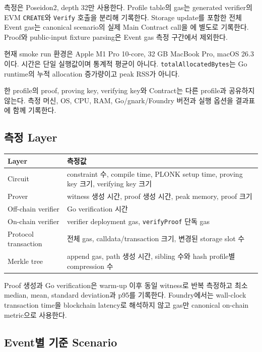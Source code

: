 \documentclass[11pt,a4paper]{extarticle}
\begin{document}
측정은 Poseidon2, depth 32만 사용한다. Profile table의 gas는 generated verifier의
EVM \texttt{CREATE}와 \texttt{Verify} 호출을 분리해 기록한다. Storage update를 포함한
전체 Event gas는 canonical scenario의 실제 Main Contract call을
에 별도로 기록한다. Proof와 public-input
fixture parsing은 Event gas 측정 구간에서 제외한다.

현재 smoke run 환경은 Apple M1 Pro 10-core, 32 GB MacBook Pro, macOS 26.3이다.
시간은 단일 실행값이며 통계적 평균이 아니다. \texttt{totalAllocatedBytes}는 Go runtime의
누적 allocation 증가량이고 peak RSS가 아니다.

한 profile의 proof, proving key, verifying key와 Contract는 다른 profile과 공유하지
않는다. 측정 머신, OS, CPU, RAM, Go/gnark/Foundry 버전과 실행 옵션을 결과표에 함께
기록한다.

\subsection{측정 Layer}

\begin{longtable}{@{}p{}p{}@{}}
\toprule
Layer & 측정값 \\
\midrule
\endhead
Circuit & constraint 수, compile time, PLONK setup time, proving key 크기, verifying key 크기 \\
Prover & witness 생성 시간, proof 생성 시간, peak memory, proof 크기 \\
Off-chain verifier & Go verification 시간 \\
On-chain verifier & verifier deployment gas, \texttt{verifyProof} 단독 gas \\
Protocol transaction & 전체 gas, calldata/transaction 크기, 변경된 storage slot 수 \\
Merkle tree & append gas, path 생성 시간, sibling 수와 hash profile별 compression 수 \\
\bottomrule
\end{longtable}

Proof 생성과 Go verification은 warm-up 이후 동일 witness로 반복 측정하고 최소
median, mean, standard deviation과 p95를 기록한다. Foundry에서는 wall-clock
transaction time을 blockchain latency로 해석하지 않고 gas만 canonical on-chain
metric으로 사용한다.

\subsection{Event별 기준 Scenario}
\end{document}
